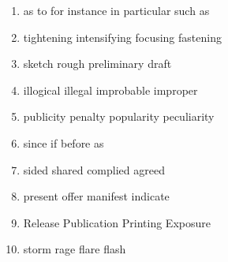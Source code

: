 \newpage
\begin{enumerate}
	\item

\fourchoices
{as to}
{for instance}
{in particular}
{such as}




\item


\fourchoices
{tightening}
{intensifying}
{focusing}
{fastening}




\item


\fourchoices
{sketch}
{rough}
{preliminary}
{draft}




\item


\fourchoices
{illogical}
{illegal}
{improbable}
{improper}




\item


\fourchoices
{publicity}
{penalty}
{popularity}
{peculiarity}




\item


\fourchoices
{since}
{if}
{before}
{as}




\item


\fourchoices
{sided}
{shared}
{complied}
{agreed}




\item


\fourchoices
{present}
{offer}
{manifest}
{indicate}




\item


\fourchoices
{Release}
{Publication}
{Printing}
{Exposure}




\item


\fourchoices
{storm}
{rage}
{flare}
{flash}





\end{enumerate}
